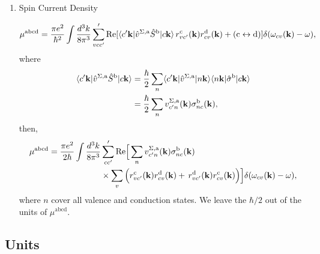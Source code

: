 \documentclass[12pt]{article}
\numberwithin{equation}{section}
\begin{document}
\begin{enumerate}
\item Spin Current Density

\begin{align}\label{ee.00}
\mu^{\mathrm{abcd}}=
\frac{\pi e^2}{\hbar^2}\int \frac{d^3k}{8\pi^3}
\sum'_{vcc'}\mathrm{Re}
[
\langle c'\mathbf{k} |\hat v^{\Sigma,\mathrm{a}}\hat S^{\mathrm{b}}| c\mathbf{k} \rangle
\,r^{\mathrm{c}}_{vc'}(\mathbf{k}) r^{\mathrm{d}}_{cv}(\mathbf{k})  
+ (\mathrm{c}\leftrightarrow\mathrm{d})  
]\delta(\omega_{cv}(\mathbf{k})-\omega),
\end{align} 
where
\begin{align}\label{ee.1}
\langle c'\mathbf{k} |\hat v^{\Sigma,\mathrm{a}}\hat S^{\mathrm{b}}| c\mathbf{k} \rangle
&
=\frac{\hbar}{2}
\sum_n \langle c'\mathbf{k} |\hat v^{\Sigma,\mathrm{a}}| n\mathbf{k} \rangle\langle n\mathbf{k} |\hat {\sigma}^{\mathrm{b}}| c\mathbf{k} \rangle
\nonumber\\
&
=\frac{\hbar}{2}
\sum_n v^{\Sigma,\mathrm{a}}_{c'n}(\mathbf{k})\sigma^{\mathrm{b}}_{nc}(\mathbf{k})
,
\end{align}
then,
\begin{align}\label{ee.0}
\mu^{\mathrm{abcd}}=
\frac{\pi e^2}{2\hbar}\int \frac{d^3k}{8\pi^3}
&\sum'_{cc'}\mathrm{Re}\Big[
\sum_n 
v^{\Sigma,\mathrm{a}}_{c'n}(\mathbf{k})\sigma^{\mathrm{b}}_{nc}(\mathbf{k})
\nonumber\\
&\times\sum_v\Big(
r^{\mathrm{c}}_{vc'}(\mathbf{k}) r^{\mathrm{d}}_{cv}(\mathbf{k}) 
+ \,r^{\mathrm{d}}_{vc'}(\mathbf{k}) r^{\mathrm{c}}_{cv}(\mathbf{k}) 
\Big) 
\Big]\delta(\omega_{cv}(\mathbf{k})-\omega),
\end{align}
where $n$ cover all valence and conduction states. We leave the
$\hbar/2$ out of the units of $\mu^{\mathrm{abcd}}$.

\end{enumerate}

\subsection{Units}\label{units}
 
\end{document}
